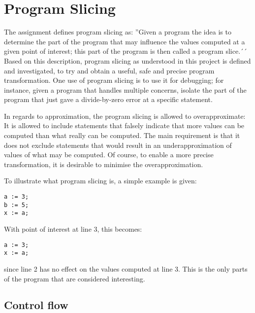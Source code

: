 
\section{Program Slicing}

The assignment defines program slicing  as:
''Given a program the idea is to determine the part of the program that may influence the values
computed at a given point of interest; this part of the program is then called a program slice.´´
Based on this description, program slicing as understood in this project is defined and investigated,
to try and obtain a useful, safe and precise program transformation.
One use of program slicing is to use it for debugging; for instance, given a program that handles
multiple concerns, isolate the part of the program that just gave a divide-by-zero error at a
specific statement.

In regards to approximation, the program slicing is allowed to overapproximate: It is allowed to include statements
that falsely indicate that more values can be computed than what really can be computed.
The main requirement is that it does not exclude statements that would result in an underapproximation
of values of what may be computed. Of course, to enable a more precise transformation, it is desirable
to minimise the overapproximation.

To illustrate what program slicing is, a simple example is given:
\begin{lstlisting}
a := 3;
b := 5;
x := a;
\end{lstlisting}
With point of interest at line 3, this becomes:
\begin{lstlisting}
a := 3;
x := a;
\end{lstlisting}
since line 2 has no effect on the values computed at line 3.
This is the only parts of the program that are considered interesting.

\subsection{Control flow}


